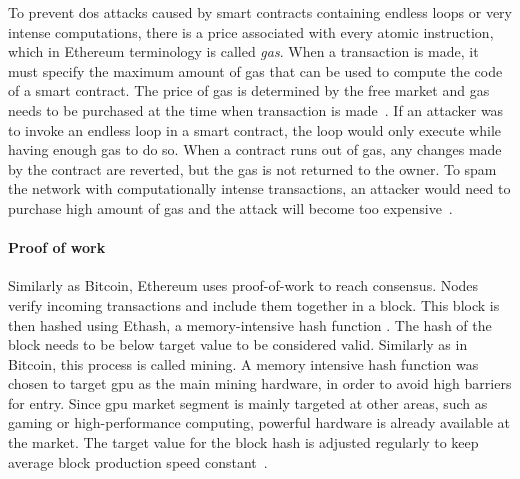 To prevent \acrfull{dos} attacks caused by smart contracts containing endless loops or very intense computations, there is a price associated with every atomic instruction, which in Ethereum terminology is called \textit{gas}. When a transaction is made, it must specify the maximum amount of gas that can be used to compute the code of a smart contract. The price of gas is determined by the free market and gas needs to be purchased at the time when transaction is made~\cite{EthereumCommunityEthereumDocumentation}. If an attacker was to invoke an endless loop in a smart contract, the loop would only execute while having enough gas to do so. When a contract runs out of gas, any changes made by the contract are reverted, but the gas is not returned to the owner. To spam the network with computationally intense transactions, an attacker would need to purchase high amount of gas and the attack will become too expensive~\cite[p.5]{Atzei2017ASoK}.

\paragraph{Proof of work}
Similarly as Bitcoin, Ethereum uses proof-of-work to reach consensus. Nodes verify incoming transactions and include them together in a block. This block is then hashed using Ethash, a memory-intensive hash function \cite[p. 211]{Tikhomirov2018Ethereum:Perspectives}. The hash of the block needs to be below target value to be considered valid. Similarly as in Bitcoin, this process is called mining.  A memory intensive hash function was chosen to target \acrshort{gpu} as the main mining hardware, in order to avoid high barriers for entry. Since \acrshort{gpu} market segment is mainly targeted at other areas, such as gaming or high-performance computing, powerful hardware is already available at the market\footnotemark. The target value for the block hash is adjusted regularly to keep average block production speed constant~\cite{Tikhomirov2018Ethereum:Perspectives}.
% 

